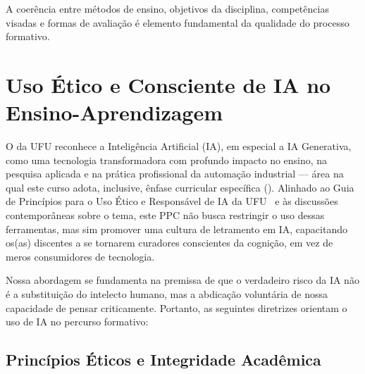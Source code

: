 A coerência entre métodos de ensino, objetivos da disciplina, competências visadas e formas de avaliação é elemento fundamental da qualidade do processo formativo.

\section{Uso Ético e Consciente de IA no Ensino-Aprendizagem}
\label{sec:IA-UFU}

O \ppccurso da UFU reconhece a Inteligência Artificial (IA), em especial a IA Generativa, como uma tecnologia transformadora com profundo impacto no ensino, na pesquisa aplicada e na prática profissional da automação industrial — área na qual este curso adota, inclusive, ênfase curricular específica (\ppcenfasecurricular). Alinhado ao Guia de Princípios para o Uso Ético e Responsável de IA da UFU~\cite{ufu_guia_ia_2025} e às discussões contemporâneas sobre o tema, este PPC não busca restringir o uso dessas ferramentas, mas sim promover uma cultura de letramento em IA, capacitando os(as) discentes a se tornarem curadores conscientes da cognição, em vez de meros consumidores de tecnologia.

Nossa abordagem se fundamenta na premissa de que o verdadeiro risco da IA não é a substituição do intelecto humano, mas a abdicação voluntária de nossa capacidade de pensar criticamente. Portanto, as seguintes diretrizes orientam o uso de IA no percurso formativo:

\subsection{Princípios Éticos e Integridade Acadêmica}

